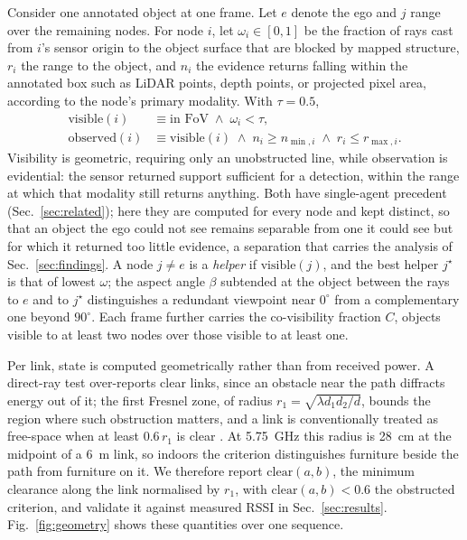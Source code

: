 \documentclass[conference]{IEEEtran}
\begin{document}
Consider one annotated object at one frame. Let $e$ denote the ego and
$j$ range over the remaining nodes. For node $i$, let
$\omega_i \in [0,1]$ be the fraction of rays cast from $i$'s sensor
origin to the object surface that are blocked by mapped structure,
$r_i$ the range to the object, and $n_i$ the evidence returns falling
within the annotated box such as LiDAR points, depth points, or
projected pixel area, according to the node's primary modality. With
$\tau = 0.5$,
%
\begin{align}
\mathrm{visible}(i) &\equiv \text{in FoV} \;\wedge\; \omega_i < \tau,
\label{eq:visible}\\
\mathrm{observed}(i) &\equiv \mathrm{visible}(i) \;\wedge\; n_i \ge n_{\min,i}
\;\wedge\; r_i \le r_{\max,i}.
\label{eq:observed}
\end{align}
%
Visibility is geometric, requiring only an unobstructed line, while
observation is evidential: the sensor returned support sufficient for
a detection, within the range at which that modality still returns
anything. Both have single-agent precedent (Sec.~\ref{sec:related});
here they are computed for every node and kept distinct, so that an
object the ego could not see remains separable from one it could see
but for which it returned too little evidence, a separation that
carries the analysis of Sec.~\ref{sec:findings}. A node $j \ne e$ is
a \emph{helper} if $\mathrm{visible}(j)$, and the best helper
$j^\star$ is that of lowest $\omega$; the aspect angle $\beta$
subtended at the object between the rays to $e$ and to $j^\star$
distinguishes a redundant viewpoint near $0^\circ$ from a
complementary one beyond $90^\circ$. Each frame further carries the
co-visibility fraction $C$, objects visible to at least two nodes over
those visible to at least one.

Per link, state is computed geometrically rather than from received
power. A direct-ray test over-reports clear links, since an obstacle
near the path diffracts energy out of it; the first Fresnel zone, of
radius $r_1 = \sqrt{\lambda d_1 d_2 / d}$, bounds the region where
such obstruction matters, and a link is conventionally treated as
free-space when at least $0.6\,r_1$ is clear \cite{itup530}. At
\SI{5.75}{\giga\hertz} this radius is \SI{28}{\centi\metre} at the
midpoint of a \SI{6}{\metre} link, so indoors the criterion
distinguishes furniture beside the path from furniture on it. We
therefore report $\mathrm{clear}(a,b)$, the minimum clearance along
the link normalised by $r_1$, with $\mathrm{clear}(a,b) < 0.6$ the
obstructed criterion, and validate it against measured RSSI in
Sec.~\ref{sec:results}. Fig.~\ref{fig:geometry} shows these
quantities over one sequence.
\end{document}

